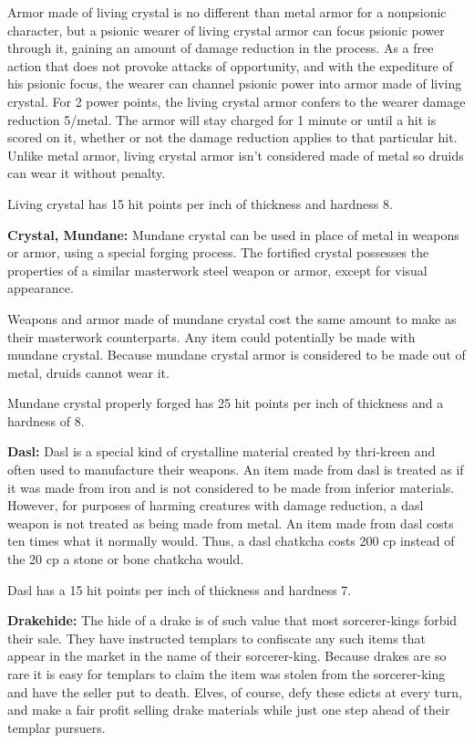 Armor made of living crystal is no different than metal armor for a nonpsionic character, but a psionic wearer of living crystal armor can focus psionic power through it, gaining an amount of damage reduction in the process. As a free action that does not provoke attacks of opportunity, and with the expediture of his psionic focus, the wearer can channel psionic power into armor made of living crystal. For 2 power points, the living crystal armor confers to the wearer damage reduction 5/metal. The armor will stay charged for 1 minute or until a hit is scored on it, whether or not the damage reduction applies to that particular hit. Unlike metal armor, living crystal armor isn't considered made of metal so druids can wear it without penalty.

Living crystal has 15 hit points per inch of thickness and hardness 8.

\textbf{Crystal, Mundane:} Mundane crystal can be used in place of metal in weapons or armor, using a special forging process. The fortified crystal possesses the properties of a similar masterwork steel weapon or armor, except for visual appearance.

Weapons and armor made of mundane crystal cost the same amount to make as their masterwork counterparts. Any item could potentially be made with mundane crystal. Because mundane crystal armor is considered to be made out of metal, druids cannot wear it.

Mundane crystal properly forged has 25 hit points per inch of thickness and a hardness of 8.

\textbf{Dasl:} Dasl is a special kind of crystalline material created by thri-kreen and often used to manufacture their weapons. An item made from dasl is treated as if it was made from iron and is not considered to be made from inferior materials. However, for purposes of harming creatures with damage reduction, a dasl weapon is not treated as being made from metal. An item made from dasl costs ten times what it normally would. Thus, a dasl chatkcha costs 200 cp instead of the 20 cp a stone or bone chatkcha would.

Dasl has a 15 hit points per inch of thickness and hardness 7.

\textbf{Drakehide:} The hide of a drake is of such value that most sorcerer-kings forbid their sale. They have instructed templars to confiscate any such items that appear in the market in the name of their sorcerer-king. Because drakes are so rare it is easy for templars to claim the item was stolen from the sorcerer-king and have the seller put to death. Elves, of course, defy these edicts at every turn, and make a fair profit selling drake materials while just one step ahead of their templar pursuers.

